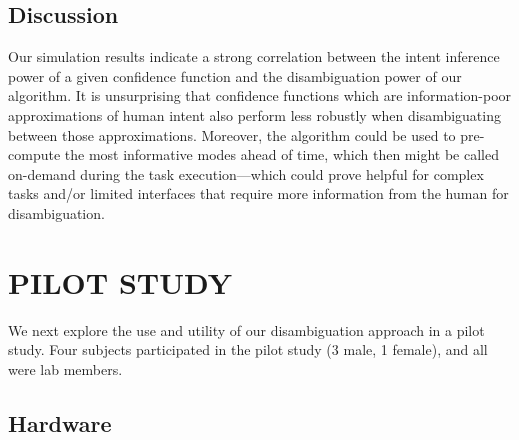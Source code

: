 \documentclass[conference]{IEEEtran}
\begin{document}
 \subsection{Discussion}
Our simulation results indicate a strong correlation between the intent inference power of a given confidence function and the disambiguation power of our algorithm. It is unsurprising that confidence functions which are information-poor approximations of human intent also perform less robustly when disambiguating between those approximations.
 Moreover, the algorithm could be used to pre-compute the most informative modes ahead of time, which then might be called on-demand during the task execution---which could prove helpful for complex tasks and/or limited interfaces that require more information from the human for disambiguation. 
 \section{PILOT STUDY} \label{EXP}
 We next explore the use and utility of our disambiguation approach in a pilot study. Four subjects participated in the pilot study (3 male, 1 female), and all were lab members.
 \subsection{Hardware}\label{HARDWARE}
 
\end{document}
